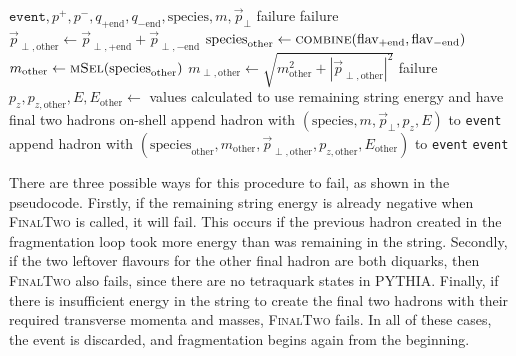 \documentclass[12pt,a4paper]{report}
\begin{document}
\begin{algorithm}
  \caption{The procedure to create the final two hadrons in PYTHIA 8.315.}\label{alg:finaltwo}
  \begin{algorithmic}
     {$\texttt{event}, p^+, p^-, q_{+\text{end}},q_{-\text{end}}, \text{species}, m, \vec{p}_\perp$}
        \State \Return failure 
      \EndIf
        \State \Return failure 
      \EndIf
      \State $\vec{p}_{\perp,\text{other}} \gets \vec{p}_{\perp,+\text{end}} + \vec{p}_{\perp,-\text{end}}$
      \Repeat
        \State $\text{species}_\text{other} \gets \textsc{combine}(\text{flav}_{+\text{end}}, \text{flav}_{-\text{end}})$
        \State $m_\text{other} \gets \textsc{mSel}(\text{species}_\text{other})$
      \State $m_{\perp,\text{other}} \gets \sqrt{m_\text{other}^2 + |\vec{p}_{\perp,\text{other}}|^2}$
        \State \Return failure 
      \EndIf
      \State $p_z, p_{z,\text{other}}, E, E_\text{other} \gets$ values calculated to use remaining string energy and have final two hadrons on-shell
      \State append hadron with $(\text{species}, m, \vec{p}_\perp, p_z, E)$ to \texttt{event}
      \State append hadron with $(\text{species}_\text{other}, m_\text{other}, \vec{p}_{\perp,\text{other}}, p_{z,\text{other}}, E_\text{other})$ to \texttt{event}
      \State \Return \texttt{event}
    \EndProcedure
  \end{algorithmic}
\end{algorithm}

There are three possible ways for this procedure to fail, as shown in the pseudocode. Firstly, if the remaining string energy is already negative when \textsc{FinalTwo} is called, it will fail. This occurs if the previous hadron created in the fragmentation loop took more energy than was remaining in the string. Secondly, if the two leftover flavours for the other final hadron are both diquarks, then \textsc{FinalTwo} also fails, since there are no tetraquark states in PYTHIA. Finally, if there is insufficient energy in the string to create the final two hadrons with their required transverse momenta and masses, \textsc{FinalTwo} fails. In all of these cases, the event is discarded, and fragmentation begins again from the beginning.
\end{document}
